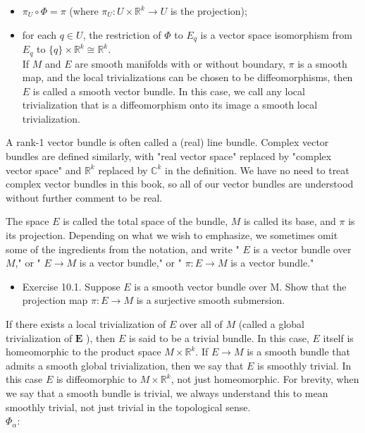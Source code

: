 \documentclass[10pt]{article}
\begin{document}
\begin{itemize}
  \item $\pi_{U} \circ \Phi=\pi$ (where $\pi_{U}: U \times \mathbb{R}^{k} \rightarrow U$ is the projection);
  \item for each $q \in U$, the restriction of $\Phi$ to $E_{q}$ is a vector space isomorphism from $E_{q}$ to $\{q\} \times \mathbb{R}^{k} \cong \mathbb{R}^{k}$.\\
If $M$ and $E$ are smooth manifolds with or without boundary, $\pi$ is a smooth map, and the local trivializations can be chosen to be diffeomorphisms, then $E$ is called a smooth vector bundle. In this case, we call any local trivialization that is a diffeomorphism onto its image a smooth local trivialization.
\end{itemize}

A rank-1 vector bundle is often called a (real) line bundle. Complex vector bundles are defined similarly, with "real vector space" replaced by "complex vector space" and $\mathbb{R}^{k}$ replaced by $\mathbb{C}^{k}$ in the definition. We have no need to treat complex vector bundles in this book, so all of our vector bundles are understood without further comment to be real.

The space $E$ is called the total space of the bundle, $M$ is called its base, and $\pi$ is its projection. Depending on what we wish to emphasize, we sometimes omit some of the ingredients from the notation, and write " $E$ is a vector bundle over $M$," or " $E \rightarrow M$ is a vector bundle," or " $\pi: E \rightarrow M$ is a vector bundle."

\begin{itemize}
  \item Exercise 10.1. Suppose $E$ is a smooth vector bundle over M. Show that the projection map $\pi: E \rightarrow M$ is a surjective smooth submersion.
\end{itemize}

If there exists a local trivialization of $E$ over all of $M$ (called a global trivialization of $\boldsymbol{E}$ ), then $E$ is said to be a trivial bundle. In this case, $E$ itself is homeomorphic to the product space $M \times \mathbb{R}^{k}$. If $E \rightarrow M$ is a smooth bundle that admits a smooth global trivialization, then we say that $E$ is smoothly trivial. In this case $E$ is diffeomorphic to $M \times \mathbb{R}^{k}$, not just homeomorphic. For brevity, when we say that a smooth bundle is trivial, we always understand this to mean smoothly trivial, not just trivial in the topological sense.\\
$\Phi_{\alpha}:$
\end{document}
